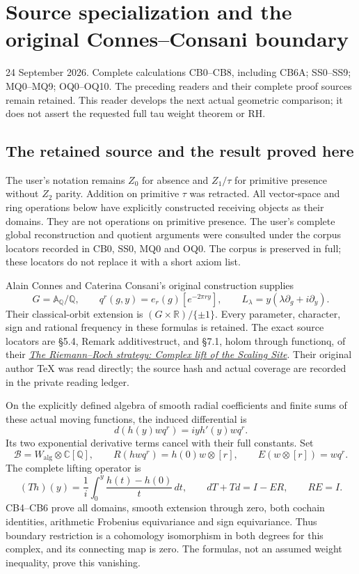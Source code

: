 \section{Source specialization and the original Connes--Consani
boundary}\label{source-specialization-and-the-original-connesconsani-boundary}

24 September 2026. Complete calculations CB0--CB8, including CB6A;
SS0--SS9; MQ0--MQ9; OQ0--OQ10. The preceding readers and their complete
proof sources remain retained. This reader develops the next actual
geometric comparison; it does not assert the requested full tau weight
theorem or RH.

\subsection{The retained source and the result proved
here}\label{the-retained-source-and-the-result-proved-here}

The user's notation remains \(Z_0\) for absence and \(Z_1/\tau\) for
primitive presence without \(Z_2\) parity. Addition on primitive
\(\tau\) was retracted. All vector-space and ring operations below have
explicitly constructed receiving objects as their domains. They are not
operations on primitive presence. The user's complete global
reconstruction and quotient arguments were consulted under the corpus
locators recorded in CB0, SS0, MQ0 and OQ0. The corpus is preserved in
full; these locators do not replace it with a short axiom list.

Alain Connes and Caterina Consani's original construction supplies \[
G=\mathbb A_{\mathbb Q}/\mathbb Q,
\qquad
q^r(g,y)=e_r(g)[e^{-2\pi r y}],
\qquad
L_\lambda=y(\lambda\partial_g+i\partial_y).
\] Their classical-orbit extension is \((G\times\mathbb R)/\{\pm1\}\).
Every parameter, character, sign and rational frequency in these
formulas is retained. The exact source locators are §5.4, Remark
additivestruct, and §7.1, holom through functionq, of their
\href{https://arxiv.org/abs/1805.10501v1}{\emph{The Riemann--Roch
strategy: Complex lift of the Scaling Site}}. Their original author TeX
was read directly; the source hash and actual coverage are recorded in
the private reading ledger.

On the explicitly defined algebra of smooth radial coefficients and
finite sums of these actual moving functions, the induced differential
is \[
d(h(y)wq^r)=iyh'(y)wq^r.
\] Its two exponential derivative terms cancel with their full
constants. Set \[
\mathcal B=W_{\mathrm{alg}}\otimes\mathbb C[\mathbb Q],
\qquad
R(h wq^r)=h(0)w\otimes[r],
\qquad
E(w\otimes[r])=wq^r.
\] The complete lifting operator is \[
(Th)(y)=\frac1i\int_0^y\frac{h(t)-h(0)}t\,dt,
\qquad dT+Td=I-ER,\qquad RE=I.
\] CB4--CB6 prove all domains, smooth extension through zero, both
cochain identities, arithmetic Frobenius equivariance and sign
equivariance. Thus boundary restriction is a cohomology isomorphism in
both degrees for this complex, and its connecting map is zero. The
formulas, not an assumed weight inequality, prove this vanishing.

